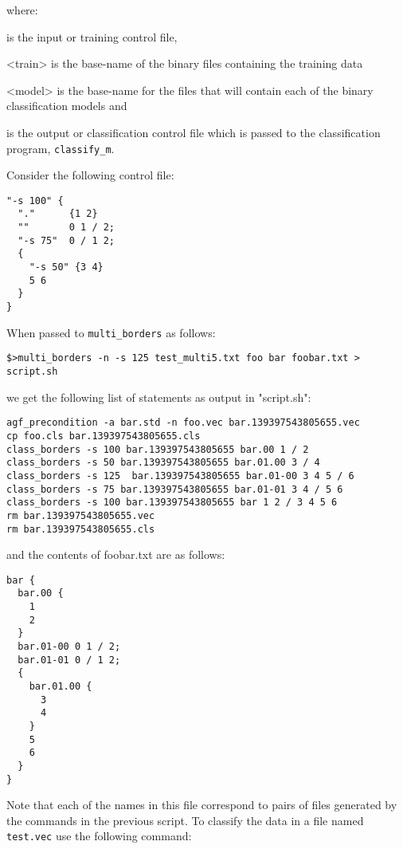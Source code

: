 \documentclass[12pt]{article}
\begin{document}
where:
\begin{list}
\item<control-in> is the input or training control file, 
\item<train> is the base-name of the binary files containing the training data
\item<model> is the base-name for the files that will contain each of the binary classification models and 
\item<control-out> is the output or classification control file which is passed to the classification program, \verb/classify_m/.  

Consider the following control file:

\begin{verbatim}
"-s 100" {
  "."      {1 2}
  ""       0 1 / 2;
  "-s 75"  0 / 1 2;
  {
    "-s 50" {3 4}
    5 6
  } 
}
\end{verbatim}

When passed to \verb/multi_borders/ as follows:

\begin{verbatim}
$>multi_borders -n -s 125 test_multi5.txt foo bar foobar.txt > script.sh
\end{verbatim}

we get the following list of statements as output in "script.sh":

\begin{verbatim}
agf_precondition -a bar.std -n foo.vec bar.139397543805655.vec
cp foo.cls bar.139397543805655.cls
class_borders -s 100 bar.139397543805655 bar.00 1 / 2
class_borders -s 50 bar.139397543805655 bar.01.00 3 / 4
class_borders -s 125  bar.139397543805655 bar.01-00 3 4 5 / 6
class_borders -s 75 bar.139397543805655 bar.01-01 3 4 / 5 6
class_borders -s 100 bar.139397543805655 bar 1 2 / 3 4 5 6
rm bar.139397543805655.vec
rm bar.139397543805655.cls
\end{verbatim}

and the contents of foobar.txt are as follows:

\begin{verbatim}
bar {
  bar.00 {
    1
    2 
  }
  bar.01-00 0 1 / 2;
  bar.01-01 0 / 1 2;
  {
    bar.01.00 {
      3
      4
    }
    5
    6
  }
}
\end{verbatim}

Note that each of the names in this file correspond to pairs of files generated by the commands in the previous script. To classify the data in a file named \verb"test.vec" use the following command:


\end{list}
\end{document}

